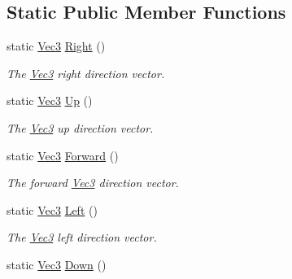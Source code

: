 \subsection*{Static Public Member Functions}
\begin{DoxyCompactItemize}
\item 
\hypertarget{classgofxmath_1_1_vec3_a3843a434bea55846dec8e084b5014ec8}{}static \hyperlink{classgofxmath_1_1_vec3}{Vec3} \hyperlink{classgofxmath_1_1_vec3_a3843a434bea55846dec8e084b5014ec8}{Right} ()\label{classgofxmath_1_1_vec3_a3843a434bea55846dec8e084b5014ec8}

\begin{DoxyCompactList}\small\item\em The \hyperlink{classgofxmath_1_1_vec3}{Vec3} right direction vector. \end{DoxyCompactList}\item 
\hypertarget{classgofxmath_1_1_vec3_a577a89d8bc72f925851bc5c3e5e4700e}{}static \hyperlink{classgofxmath_1_1_vec3}{Vec3} \hyperlink{classgofxmath_1_1_vec3_a577a89d8bc72f925851bc5c3e5e4700e}{Up} ()\label{classgofxmath_1_1_vec3_a577a89d8bc72f925851bc5c3e5e4700e}

\begin{DoxyCompactList}\small\item\em The \hyperlink{classgofxmath_1_1_vec3}{Vec3} up direction vector. \end{DoxyCompactList}\item 
\hypertarget{classgofxmath_1_1_vec3_a386d5fbb2fb2727db4204a0fc66fda16}{}static \hyperlink{classgofxmath_1_1_vec3}{Vec3} \hyperlink{classgofxmath_1_1_vec3_a386d5fbb2fb2727db4204a0fc66fda16}{Forward} ()\label{classgofxmath_1_1_vec3_a386d5fbb2fb2727db4204a0fc66fda16}

\begin{DoxyCompactList}\small\item\em The forward \hyperlink{classgofxmath_1_1_vec3}{Vec3} direction vector. \end{DoxyCompactList}\item 
\hypertarget{classgofxmath_1_1_vec3_a161acaeebbaa305fecee0c53a119bc34}{}static \hyperlink{classgofxmath_1_1_vec3}{Vec3} \hyperlink{classgofxmath_1_1_vec3_a161acaeebbaa305fecee0c53a119bc34}{Left} ()\label{classgofxmath_1_1_vec3_a161acaeebbaa305fecee0c53a119bc34}

\begin{DoxyCompactList}\small\item\em The \hyperlink{classgofxmath_1_1_vec3}{Vec3} left direction vector. \end{DoxyCompactList}\item 
\hypertarget{classgofxmath_1_1_vec3_ab0aea11f78b5ed9702dbd3f9dec87f9c}{}static \hyperlink{classgofxmath_1_1_vec3}{Vec3} \hyperlink{classgofxmath_1_1_vec3_ab0aea11f78b5ed9702dbd3f9dec87f9c}{Down} ()\label{classgofxmath_1_1_vec3_ab0aea11f78b5ed9702dbd3f9dec87f9c}


\end{DoxyCompactItemize}
